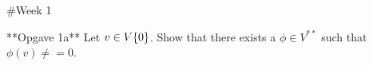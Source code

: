 #Week 1 

**Opgave 1a** Let $v \in V\\ \{0\}$. Show that there exists a $\phi \in V^{**}$ such that $\phi(v) \neq =0$. 